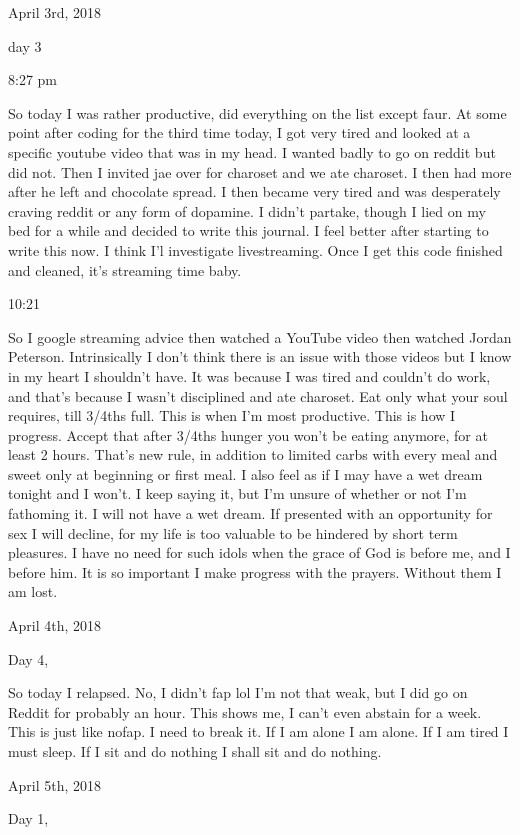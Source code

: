 \bigskip
\bigskip
April 3rd, 2018

day 3

8:27 pm

So today I was rather productive, did everything on the list except
faur. At some point after coding for the third time today, I got very
tired and looked at a specific youtube video that was in my head. I
wanted badly to go on reddit but did not. Then I invited jae over for
charoset and we ate charoset. I then had more after he left and
chocolate spread. I then became very tired and was desperately craving
reddit or any form of dopamine. I didn't partake, though I lied on my
bed for a while and decided to write this journal. I feel better after
starting to write this now. I think I'l investigate livestreaming. Once
I get this code finished and cleaned, it's streaming time baby.

10:21

So I google streaming advice then watched a YouTube video then watched
Jordan Peterson. Intrinsically I don't think there is an issue with
those videos but I know in my heart I shouldn't have. It was because I
was tired and couldn't do work, and that's because I wasn't disciplined
and ate charoset. Eat only what your soul requires, till 3/4ths full.
This is when I'm most productive. This is how I progress. Accept that
after 3/4ths hunger you won't be eating anymore, for at least 2 hours.
That's new rule, in addition to limited carbs with every meal and sweet
only at beginning or first meal. I also feel as if I may have a wet
dream tonight and I won't. I keep saying it, but I'm unsure of whether
or not I'm fathoming it. I will not have a wet dream. If presented with
an opportunity for sex I will decline, for my life is too valuable to be
hindered by short term pleasures. I have no need for such idols when the
grace of God is before me, and I before him. It is so important I make
progress with the prayers. Without them I am lost.

\bigskip
\bigskip
April 4th, 2018

Day 4,

So today I relapsed. No, I didn't fap lol I'm not that weak, but I did
go on Reddit for probably an hour. This shows me, I can't even abstain
for a week. This is just like nofap. I need to break it. If I am alone I
am alone. If I am tired I must sleep. If I sit and do nothing I shall
sit and do nothing.

\bigskip
\bigskip
April 5th, 2018

Day 1,

